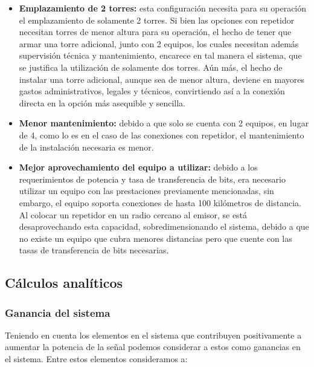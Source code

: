 \documentclass[11pt,a4paper]{article}
\begin{document}
\begin{itemize}
  \item  \textbf{Emplazamiento de 2 torres:} esta configuración necesita para su operación el emplazamiento de solamente 2 torres. 
  Si bien las opciones con repetidor necesitan torres de menor altura para su operación, el hecho de tener que armar una torre adicional, junto con 2 equipos, los cuales necesitan además supervisión técnica y mantenimiento, encarece en tal manera el sistema, que se justifica la utilización de solamente dos torres. 
  Aún más, el hecho de instalar una torre adicional, aunque sea de menor altura, deviene en mayores gastos administrativos, legales y técnicos, convirtiendo así a la conexión directa en la opción más asequible y sencilla.

  \item \textbf{ Menor mantenimiento:} debido a que solo se cuenta con 2 equipos, en lugar de 4, como lo es en el caso de las conexiones con repetidor, el mantenimiento de la instalación necesaria es menor.

  \item \textbf{ Mejor aprovechamiento del equipo a utilizar:} debido a los requerimientos de potencia y tasa de transferencia de bits, era necesario utilizar un equipo con las prestaciones previamente mencionadas, sin embargo, el equipo soporta conexiones de hasta 100 kilómetros de distancia. 
  Al colocar un repetidor en un radio cercano al emisor, se está desaprovechando esta capacidad, sobredimensionando el sistema, debido a que no existe un equipo que cubra menores distancias pero que cuente con las tasas de transferencia de bits necesarias.
\end{itemize}

\subsection{Cálculos analíticos}

\subsubsection{Ganancia del sistema}

Teniendo en cuenta los elementos en el sistema que contribuyen positivamente a aumentar la potencia de la señal podemos considerar a estos como ganancias en el sistema. Entre estos elementos consideramos a:
\end{document}
